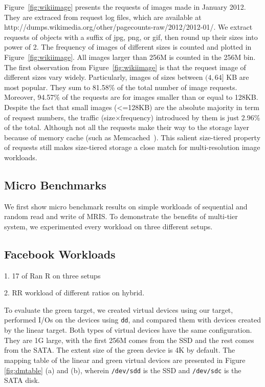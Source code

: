 Figure~\ref{fig:wikiimage} presents the requests of images made in
January 2012. They are extraced from request log files, which are
available at
http://dumps.wikimedia.org/other/pagecounts-raw/2012/2012-01/. We
extract requests of objects with a suffix of jpg, png, or gif, then
round up their sizes into power of 2. The frequency of images of
different sizes is counted and plotted in Figure~\ref{fig:wikiimage}.
All images larger than 256M is counted in the 256M bin. The first
observation from Figure~\ref{fig:wikiimage} is that the request image
of different sizes vary widely.  Particularly, images of sizes between
$(4, 64]$ KB are most popular. They sum to 81.58\% of the total number
of image requests. Moreover, 94.57\% of the requests are for images
smaller than or equal to 128KB. Despite the fact that small images
(<=128KB) are the absolute majority in term of request numbers, the
traffic (size$\times$frequency) introduced by them is just 2.96\% of
the total. Although not all the requests make their way to the storage
layer because of memory cache (such as Memcached~\cite{memcached}).
This salient size-tiered property of requests still makes size-tiered
storage a close match for multi-resolution image workloads.

\subsection{Micro Benchmarks}

We first show micro benchmark results on simple workloads of
sequential and random read and write of MRIS. To demonstrate the
benefits of multi-tier system, we experimented every workload on three
different setups. 

\subsection{Facebook Workloads}

1. 17 of Ran R on three setups

2. RR workload of different ratios on hybrid.

To evaluate the green target, we created virtual devices using our
target, performed I/Os on the devices using \texttt{dd}, and compared
them with devices created by the linear target.  Both types of virtual
devices have the same configuration. They are 1G large, with the first
256M comes from the SSD and the rest comes from the SATA. The extent
size of the green device is 4K by default. The mapping table of the
linear and green virtual devices are presented in Figure
\ref{fig:dmtable} (a) and (b), wherein \texttt{/dev/sdd} is the SSD
and \texttt{/dev/sdc} is the SATA disk. 

